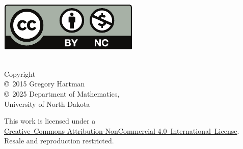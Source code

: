 \noindent
\begin{minipage}[t]{\cellwidth}\mbox{}\\
\href{http://creativecommons.org/licenses/by-nc/4.0/}{\includegraphics[alt={Creative Commons by-nc license}]{figures/raw/by-nc}}
\end{minipage}%
\begin{minipage}[t]{.4\linewidth}\raggedright\mbox{}\\
\noindent Copyright\\
\copyright~2015 Gregory Hartman\\
\copyright~2025 Department of Mathematics,\\
University of North Dakota\medskip

\noindent
This work is licensed under a\iflatexml\ \else\\\fi
\href{http://creativecommons.org/licenses/by-nc/4.0/}{Creative~Commons
Attribution-NonCommercial
4.0~International~License}.\\
Resale and reproduction restricted.
\end{minipage}

\endgroup

\restoregeometry

